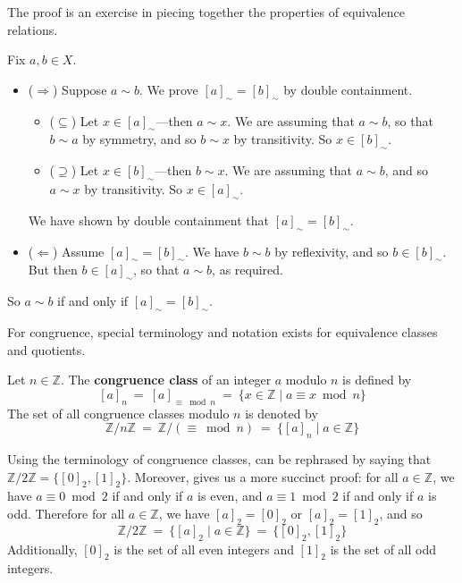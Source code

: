 \begin{cproof}
The proof is an exercise in piecing together the properties of equivalence relations.

Fix $a, b \in X$.
\begin{itemize}
\item ($\Rightarrow$) Suppose $a \sim b$. We prove $[a]_{\sim} = [b]_{\sim}$ by double containment.
\begin{itemize}
\item ($\subseteq$) Let $x \in [a]_{\sim}$---then $a \sim x$. We are assuming that $a \sim b$, so that $b \sim a$ by symmetry, and so $b \sim x$ by transitivity. So $x \in [b]_{\sim}$.
\item ($\supseteq$) Let $x \in [b]_{\sim}$---then $b \sim x$. We are assuming that $a \sim b$, and so $a \sim x$ by transitivity. So $x \in [a]_{\sim}$.
\end{itemize}
We have shown by double containment that $[a]_{\sim} = [b]_{\sim}$.

\item ($\Leftarrow$) Assume $[a]_{\sim} = [b]_{\sim}$. We have $b \sim b$ by reflexivity, and so $b \in [b]_{\sim}$. But then $b \in [a]_{\sim}$, so that $a \sim b$, as required.
\end{itemize}

So $a \sim b$ if and only if $[a]_{\sim} = [b]_{\sim}$.
\end{cproof}

For congruence, special terminology and notation exists for equivalence classes and quotients.


\begin{definition}
\label{defCongruenceClass}
Let $n \in \mathbb{Z}$. The \textbf{congruence class} of an integer $a$ modulo $n$ is defined by
\[ [a]_n ~=~ [a]_{\equiv \bmod n} ~=~ \{ x \in \mathbb{Z} \mid a \equiv x \bmod n \} \]
The set of all congruence classes modulo $n$ is denoted by
\[ \mathbb{Z}/n\mathbb{Z} ~=~ \mathbb{Z}/({\equiv \bmod n}) ~=~ \{ [a]_n \mid a \in \mathbb{Z} \} \]
\end{definition}

\begin{example}
Using the terminology of congruence classes,  can be rephrased by saying that $\mathbb{Z}/2\mathbb{Z} = \{ [0]_2, [1]_2 \}$. Moreover,  gives us a more succinct proof: for all $a \in \mathbb{Z}$, we have $a \equiv 0 \bmod 2$ if and only if $a$ is even, and $a \equiv 1 \bmod 2$ if and only if $a$ is odd. Therefore for all $a \in \mathbb{Z}$, we have $[a]_2 = [0]_2$ or $[a]_2 = [1]_2$, and so
\[ \mathbb{Z}/2\mathbb{Z} ~=~ \{ [a]_2 \mid a \in \mathbb{Z} \} ~=~ \{ [0]_2, [1]_2 \} \]
Additionally, $[0]_2$ is the set of all even integers and $[1]_2$ is the set of all odd integers.
\end{example}

